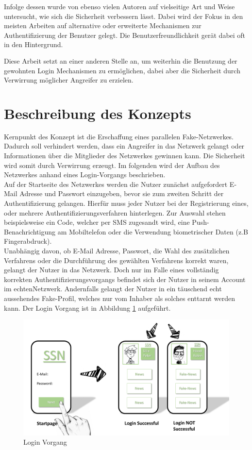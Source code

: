 \documentclass{sigchi}
\begin{document}
Infolge dessen wurde von ebenso vielen Autoren auf vielseitige Art und Weise untersucht, wie sich die Sicherheit verbessern lässt. Dabei wird der Fokus in den meisten Arbeiten auf alternative oder erweiterte Mechanismen zur Authentifizierung der Benutzer gelegt. Die Benutzerfreundlichkeit gerät dabei oft in den Hintergrund. \cite{karapanos2015sound} \cite{amin2017security} \cite{jarecki2018two}

Diese Arbeit setzt an einer anderen Stelle an, um weiterhin die Benutzung der gewohnten Login Mechanismen zu ermöglichen, dabei aber die Sicherheit durch Verwirrung möglicher Angreifer zu erzielen.

\section{Beschreibung des Konzepts}
\label{Konzept}
Kernpunkt des Konzept ist die Erschaffung eines parallelen Fake-Netzwerkes. Dadurch soll verhindert werden, dass ein Angreifer in das Netzwerk gelangt oder Informationen über die Mitglieder des Netzwerkes gewinnen kann. Die Sicherheit wird somit durch Verwirrung erzeugt. Im folgenden wird der Aufbau des Netzwerkes anhand eines Login-Vorgangs beschrieben. \\
Auf der Startseite des Netzwerkes werden die Nutzer zunächst aufgefordert E-Mail Adresse und Passwort einzugeben, bevor sie zum zweiten Schritt der Authentifizierung gelangen. Hierfür muss jeder Nutzer bei der Registrierung eines, oder mehrere Authentifizierungsverfahren hinterlegen. Zur Auswahl stehen beispielsweise ein Code, welcher per SMS zugesandt wird, eine Push-Benachrichtigung am Mobiltelefon oder die Verwendung biometrischer Daten (z.B Fingerabdruck).\\
Unabhängig davon, ob E-Mail Adresse, Passwort, die Wahl des zusätzlichen Verfahrens oder die Durchführung des gewählten Verfahrens korrekt waren, gelangt der Nutzer in das Netzwerk. Doch nur im Falle eines vollständig korrekten Authentifizierungsvorgangs befindet sich der Nutzer in seinem Account im \glqq echten\grqq Netzwerk. Andernfalls gelangt der Nutzer in ein täuschend echt aussehendes Fake-Profil, welches nur vom Inhaber als solches enttarnt werden kann. Der Login Vorgang ist in Abbildung \ref{fig:Login} aufgeführt. 
\begin{figure}[htbp]
	\includegraphics[width=0.8\columnwidth]{figures/LoginVorgang.PNG}
	\caption{Login Vorgang}
	\label{fig:Login}
\end{figure}
\end{document}

